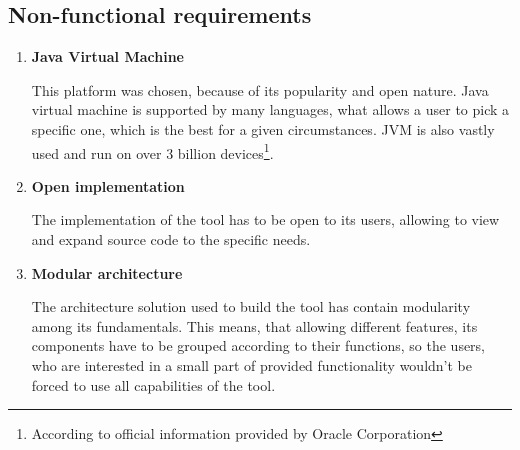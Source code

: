 \subsection{Non-functional requirements}
\begin{enumerate}
\item \textbf{Java Virtual Machine}

This platform was chosen, because of its popularity and open nature. Java virtual machine is supported by many languages, what allows a user to pick a specific one, which is the best for a given circumstances. JVM is also vastly used and run on over 3 billion devices\footnote{According to official information provided by Oracle Corporation}.
\medbreak

\item \textbf{Open implementation}

The implementation of the tool has to be open to its users, allowing to view and expand source code to the specific needs. 
\medbreak

\item \label{nfreq:modul}\textbf{Modular architecture}

The architecture solution used to build the tool has contain modularity among its fundamentals. This means, that allowing different features, its components have to be grouped according to their functions, so the users, who are interested in a small part of provided functionality wouldn't be forced to use all capabilities of the tool.

\end{enumerate}

